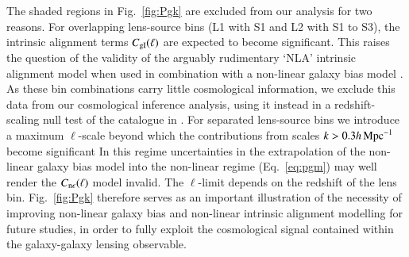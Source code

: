 The shaded regions in Fig.~\ref{fig:Pgk} are excluded from our analysis for two reasons.   For overlapping lens-source bins (L1 with S1 and L2 with S1 to S3), the intrinsic alignment terms $C_{\rm gI}(\ell)$ are expected to become significant.   This raises the question of the validity of the arguably rudimentary `NLA' intrinsic alignment model when used in combination with a non-linear galaxy bias model \citep[see][for a self-consistent pertubative approach to both intrinsic alignment and galaxy bias modelling]{blazek/etal:2019}.   As these bin combinations carry little cosmological information, we exclude this data from our cosmological inference analysis, using it instead in a redshift-scaling null test of the catalogue in \citet{giblin/etal:inprep}.   For separated lens-source bins we introduce a maximum $\ell$-scale beyond which the contributions from scales $k > 0.3 h \,{\rm Mpc}^{-1}$ become significant \citep[see figure 2 in][]{joachimi/etal:inprep}  In this regime uncertainties in the extrapolation of the \citet{sanchez/etal:2017} non-linear galaxy bias model into the non-linear regime (Eq.~\ref{eq:pgm}) may well render the $C_{\rm n \epsilon}(\ell)$ model invalid.   The $\ell$-limit depends on the redshift of the lens bin.    Fig.~\ref{fig:Pgk} therefore serves as an important illustration of the necessity of improving non-linear galaxy bias and non-linear intrinsic alignment modelling for future studies, in order to fully exploit the cosmological signal contained within the galaxy-galaxy lensing observable.


